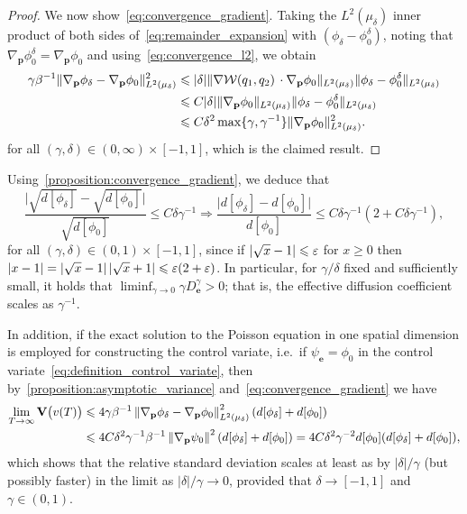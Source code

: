 \documentclass[11pt,a4paper]{article}
\newcommand{\var}[0]{\mathbf{V}}
\newcommand{\grad}{\nabla}
\newcommand{\vect}[1]{\boldsymbol{\mathbf #1}}
\theoremstyle{plain}
\numberwithin{equation}{section}
\renewcommand{\leq}{\leqslant}
\renewcommand{\geq}{\geqslant}
\begin{document}
\begin{proof}
    We now show~\eqref{eq:convergence_gradient}.
    Taking the $L^2(\mu_{\delta})$ inner product of both sides of~\eqref{eq:remainder_expansion} with $(\phi_\delta - \phi_0^{\delta})$,
    noting that $\grad_{\vect p} \phi_0^{\delta} = \grad_{\vect p} \phi_0$
    and using~\eqref{eq:convergence_l2},
    we obtain
    \begin{align*}
        \notag
        \gamma \beta^{-1} \norm*{\grad_{\vect p} \phi_\delta - \grad_{\vect p} \phi_0}[L^2(\mu_{\delta})]^2
        &\leq \lvert \delta \rvert \norm*{\grad \mathcal W(q_1, q_2) \, \cdot \grad_{\vect p} \phi_0}[L^2(\mu_{\delta})] \norm*{\phi_\delta - \phi_0^{\delta}}[L^2(\mu_{\delta})] \\
        \label{eq:intermediate_delta}
        &\leq C \lvert \delta \rvert \norm*{\grad_{\vect p} \phi_0}[L^2(\mu_{\delta})] \norm*{\phi_\delta - \phi_0^{\delta}}[L^2(\mu_{\delta})] \\
        &\leq  C \delta^2 \max\{\gamma, \gamma^{-1}\} \norm*{\grad_{\vect p} \phi_0}[L^2(\mu_{\delta})]^2.
    \end{align*}
    for all $(\gamma, \delta) \in (0, \infty) \times [-1, 1]$,
    which is the claimed result.
\end{proof}

Using~\cref{proposition:convergence_gradient},
we deduce that
\[
    \frac{ \lvert \sqrt{d[\phi_{\delta}]} - \sqrt{d[\phi_{0}]} \rvert } {\sqrt{d[\phi_{0}]}}
    \leq C \delta \gamma^{-1}
    \Rightarrow
    \frac{ \lvert d[\phi_{\delta}] - d[\phi_{0}] \rvert } {d[\phi_{0}]}
    \leq  C \delta \gamma^{-1} (2 + C \delta \gamma^{-1}),
\]
for all $(\gamma, \delta) \in (0, 1) \times [-1, 1]$,
since if $\abs{\sqrt{x} - 1} \leq \varepsilon$ for $x \geq 0$ then $\abs{x-1} = \abs{\sqrt{x} - 1} \abs{\sqrt{x} + 1} \leq \varepsilon (2 + \varepsilon)$.
In particular, for $\gamma/\delta$ fixed and sufficiently small,
it holds that $\liminf_{\gamma \to 0} \gamma D^{\gamma}_{\vect e} > 0$;
that is, the effective diffusion coefficient scales as $\gamma^{-1}$.

In addition, if the exact solution to the Poisson equation in one spatial dimension is employed for constructing the control variate,
i.e.\ if $\psi_{\vect e} = \phi_0$ in the control variate~\eqref{eq:definition_control_variate},
then by~\cref{proposition:asymptotic_variance} and~\eqref{eq:convergence_gradient}
we have
\begin{align*}
    \lim_{T \to \infty} \var \bigl(v(T)\bigr)
    &\leq 4 \gamma \beta^{-1} \norm{\grad_{\vect p} \phi_{\delta} - \grad_{\vect p} \phi_0}[L^2(\mu_{\delta})]^2 (d[\phi_{\delta}] + d[\phi_0]) \\
    &\leq 4 C \delta^2 \gamma^{-1} \beta^{-1} \norm{\grad_{\vect p} \psi_{0}}^2 (d[\phi_{\delta}] + d[\phi_0])
    = 4 C \delta^2 \gamma^{-2} d[\phi_{0}] (d[\phi_{\delta}] + d[\phi_0]),
\end{align*}
which shows that the relative standard deviation scales at least as by $\lvert \delta \rvert / \gamma$ (but possibly faster)
in the limit as $\lvert \delta \rvert/\gamma \to 0$,
provided that $\delta \to [-1, 1]$ and $\gamma \in (0, 1)$.
\end{document}
